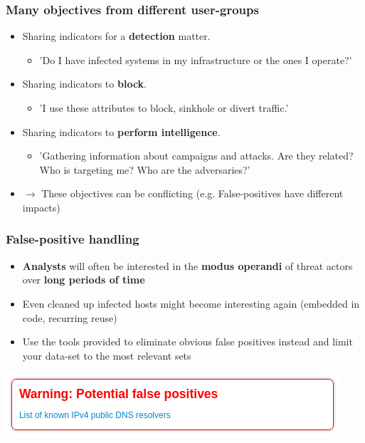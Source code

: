 \begin{frame}
\frametitle{Many objectives from different user-groups}
        \begin{itemize}
                \item Sharing indicators for a {\bf detection} matter.
                        \begin{itemize}
                                \item 'Do I have infected systems in my infrastructure or the ones I operate?'
                        \end{itemize}
                \item Sharing indicators to {\bf block}.
                        \begin{itemize}
                                \item 'I use these attributes to block, sinkhole or divert traffic.'
                        \end{itemize}
                \item Sharing indicators to {\bf perform intelligence}.
                        \begin{itemize}
                                \item 'Gathering information about campaigns and attacks. Are they related? Who is targeting me? Who are the adversaries?'
                        \end{itemize}
                \item $\rightarrow$ These objectives can be conflicting (e.g. False-positives have different impacts)
        \end{itemize}
\end{frame}

\begin{frame}
\frametitle{False-positive handling}
\begin{itemize}
    \item {\bf Analysts} will often be interested in the {\bf modus operandi} of threat actors over {\bf long periods of time}
	\item Even cleaned up infected hosts might become interesting again (embedded in code, recurring reuse)
	\item Use the tools provided to eliminate obvious false positives instead and limit your data-set to the most relevant sets
\end{itemize}
\includegraphics[scale=0.8]{screenshots/false-positive.png}
\end{frame}

